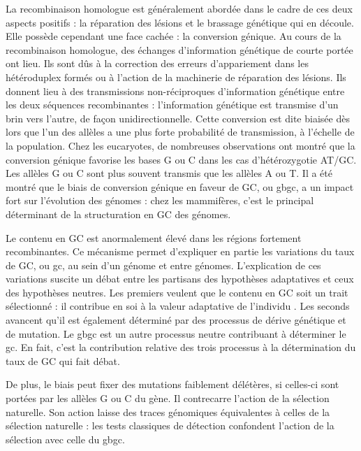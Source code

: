 \documentclass[11pt, oneside]{scrartcl}
\begin{document}
La recombinaison homologue est généralement abordée dans le cadre de ces deux
aspects positifs : la réparation des lésions et le brassage génétique qui en
découle. Elle possède cependant une face cachée : la conversion génique. Au
cours de la recombinaison homologue, des échanges d'information génétique de
courte portée ont lieu\cite{duret_biased_2009}. Ils sont dûs à la correction des
erreurs d'appariement dans les hétéroduplex formés ou à l'action de la
machinerie de réparation des lésions. Ils donnent lieu à des transmissions
non-réciproques d'information génétique entre les deux séquences recombinantes :
l'information génétique est transmise d'un brin vers l'autre, de façon
unidirectionnelle. Cette conversion est dite biaisée dès lors que l'un des
allèles a une plus forte probabilité de transmission, à l'échelle de la
population. Chez les eucaryotes, de nombreuses observations ont montré que la
conversion génique favorise les bases G ou C dans les cas d'hétérozygotie
AT/GC\cite{pessia_evidence_2012,mancera_high-resolution_2008,duret_impact_2008}.
Les allèles G ou C sont plus souvent transmis que les allèles A ou T. Il a été
montré que le biais de conversion génique en faveur de GC, ou \ac{gbgc}, a un
impact fort sur l'évolution des génomes : chez les mammifères, c'est le
principal déterminant de la structuration en GC des
génomes\cite{duret_impact_2008}.

Le contenu en GC est anormalement élevé dans les régions fortement
recombinantes. Ce mécanisme permet d'expliquer en partie les variations du taux
de GC, ou \ac{gc}, au sein d'un génome et entre génomes. L'explication de ces
variations suscite un débat entre les partisans des hypothèses adaptatives et
ceux des hypothèses neutres. Les premiers veulent que le contenu en GC soit un
trait sélectionné : il contribue en soi à la valeur adaptative de l'individu
\cite{hildebrand_evidence_2010}. Les seconds avancent qu'il est également
déterminé par des processus de dérive génétique et de mutation. Le \ac{gbgc} est
un autre processus neutre contribuant à déterminer le \ac{gc}. En fait, c'est la
contribution relative des trois processus à la détermination du taux de GC qui
fait débat.

De plus, le biais peut fixer des mutations faiblement délétères, si celles-ci
sont portées par les allèles G ou C du gène. Il contrecarre l'action de la
sélection naturelle\cite{galtier_gc-biased_2009, galtier_adaptation_2007}. Son
action laisse des traces génomiques équivalentes à celles de la sélection
naturelle : les tests classiques de détection confondent l'action de la
sélection avec celle du \ac{gbgc}\cite{ratnakumar_detecting_2010}.
\end{document}
